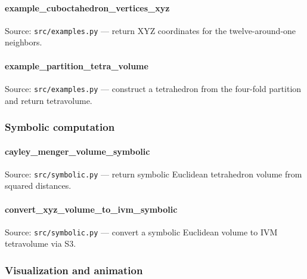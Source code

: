 \documentclass[
  10pt,
]{article}
\newcommand{\passthrough}[1]{#1}
\renewcommand{\texttt}[1]{%
    \colorbox{codebg}{\color{codefg}\ttfamily #1}%
}
\begin{document}
\hypertarget{code:example_cuboctahedron_vertices_xyz}{%
\paragraph{\texorpdfstring{\texttt{example\_cuboctahedron\_vertices\_xyz}}{example\_cuboctahedron\_vertices\_xyz}}\label{code:example_cuboctahedron_vertices_xyz}}

Source: \passthrough{\lstinline!src/examples.py!} --- return XYZ
coordinates for the twelve-around-one neighbors.

\hypertarget{code:example_partition_tetra_volume}{%
\paragraph{\texorpdfstring{\texttt{example\_partition\_tetra\_volume}}{example\_partition\_tetra\_volume}}\label{code:example_partition_tetra_volume}}

Source: \passthrough{\lstinline!src/examples.py!} --- construct a
tetrahedron from the four-fold partition and return tetravolume.

\hypertarget{code:symbolic}{%
\subsubsection{Symbolic computation}\label{code:symbolic}}

\hypertarget{code:cayley_menger_volume_symbolic}{%
\paragraph{\texorpdfstring{\texttt{cayley\_menger\_volume\_symbolic}}{cayley\_menger\_volume\_symbolic}}\label{code:cayley_menger_volume_symbolic}}

Source: \passthrough{\lstinline!src/symbolic.py!} --- return symbolic
Euclidean tetrahedron volume from squared distances.

\hypertarget{code:convert_xyz_volume_to_ivm_symbolic}{%
\paragraph{\texorpdfstring{\texttt{convert\_xyz\_volume\_to\_ivm\_symbolic}}{convert\_xyz\_volume\_to\_ivm\_symbolic}}\label{code:convert_xyz_volume_to_ivm_symbolic}}

Source: \passthrough{\lstinline!src/symbolic.py!} --- convert a symbolic
Euclidean volume to IVM tetravolume via S3.

\hypertarget{code:visualization}{%
\subsubsection{Visualization and animation}\label{code:visualization}}
\end{document}
